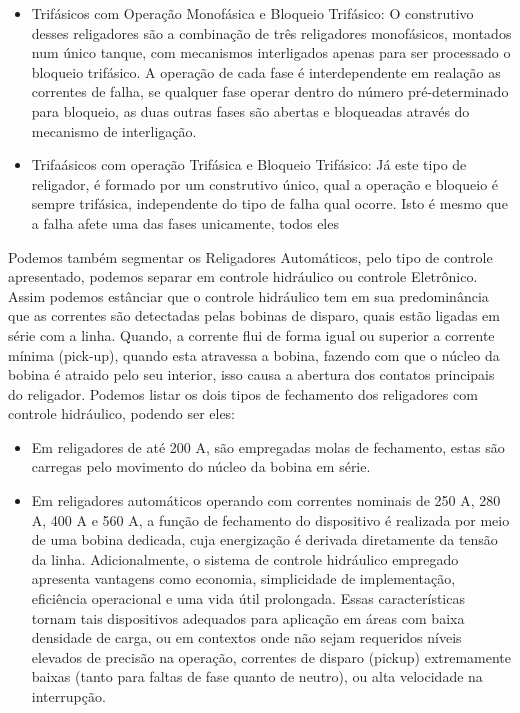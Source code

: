 \documentclass[oneside,openright,12pt]{ufsm_2021} %
\begin{document}
\begin{itemize}
	\item Trifásicos com Operação Monofásica e Bloqueio Trifásico: O construtivo desses religadores são a combinação de três religadores monofásicos, montados num único tanque, com mecanismos interligados apenas para ser processado o bloqueio trifásico. A operação de cada fase é interdependente em realação as correntes de falha, se qualquer fase operar dentro do número pré-determinado para bloqueio, as duas outras fases são abertas e bloqueadas através do mecanismo de interligação.
	\item Trifaásicos com operação Trifásica e Bloqueio Trifásico: Já este tipo de religador, é formado por um construtivo único, qual a operação e bloqueio é sempre trifásica, independente do tipo de falha qual ocorre. Isto é mesmo que a falha afete uma das fases unicamente, todos eles 
\end{itemize}

\par Podemos também segmentar os Religadores Automáticos, pelo tipo de controle apresentado, podemos separar em controle hidráulico ou controle Eletrônico. Assim podemos estânciar que o controle hidráulico tem em sua predominância que as correntes são detectadas pelas bobinas de disparo, quais estão ligadas em série com a linha. Quando, a corrente flui de forma igual ou superior a corrente mínima (pick-up), quando esta atravessa a bobina, fazendo com que o núcleo da bobina é atraido pelo seu interior, isso causa a abertura dos contatos principais do religador. Podemos listar os dois tipos de fechamento dos religadores com controle hidráulico, podendo ser eles:

\begin{itemize}
	\item Em religadores de até 200 A, são empregadas molas de fechamento, estas são carregas pelo movimento do núcleo da bobina em série.
	\item Em religadores automáticos operando com correntes nominais de 250 A, 280 A, 400 A e 560 A, a função de fechamento do dispositivo é realizada por meio de uma bobina dedicada, cuja energização é derivada diretamente da tensão da linha. Adicionalmente, o sistema de controle hidráulico empregado apresenta vantagens como economia, simplicidade de implementação, eficiência operacional e uma vida útil prolongada. Essas características tornam tais dispositivos adequados para aplicação em áreas com baixa densidade de carga, ou em contextos onde não sejam requeridos níveis elevados de precisão na operação, correntes de disparo (pickup) extremamente baixas (tanto para faltas de fase quanto de neutro), ou alta velocidade na interrupção.
\end{itemize}
\end{document}
